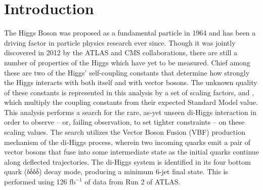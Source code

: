 %

\chapter{Introduction}\label{chapter:introduction}

%

The Higgs Boson was proposed as a fundamental particle in 1964
    and has been a driving factor in particle physics research ever since.
Though it was jointly discovered in 2012 by the ATLAS and CMS collaborations,
    there are still a number of properties of the Higgs which have yet to be measured.
Chief among these are two of the Higgs' self-coupling constants
    that determine how strongly the Higgs interacts with both itself and with vector bosons.
The unknown quality of these constants is represented in this analysis by a set of scaling factors, \kl and \kvv,
    which multiply the coupling constants from their expected Standard Model value.
This analysis performs a search for the rare,
    as-yet unseen di-Higgs interaction in order to observe -- or,
    failing observation, to set tighter constraints -- on these scaling values.
The search utilizes the Vector Boson Fusion (VBF) production mechanism of the di-Higgs process,
    wherein two incoming quarks emit a pair of vector bosons that fuse into some intermediate state
    as the initial quarks continue along deflected trajectories.
The di-Higgs system is identified in its four bottom quark ($b \bar b b \bar b$) decay mode,
    producing a minimum 6-jet final state.
This is performed using 126 $\textrm{fb}^{-1}$ of data from Run 2 of ATLAS.


